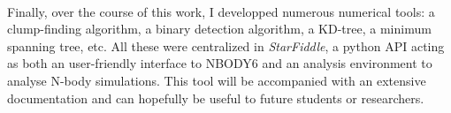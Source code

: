 \paragraph*{}
Finally, over the course of this work, I developped numerous numerical tools: a clump-finding algorithm, a binary detection algorithm, a KD-tree, a minimum spanning tree, etc. All these were centralized in \textit{StarFiddle}, a python API acting as both an user-friendly interface to NBODY6 and an analysis environment to analyse N-body simulations. This tool will be accompanied with an extensive documentation and can hopefully be useful to future students or researchers.






%
%
%
%
%
%
%
